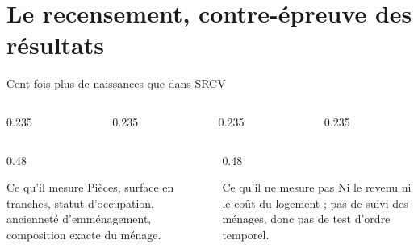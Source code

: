 \documentclass[10pt,aspectratio=169]{beamer}
\begin{document}
\section{Le recensement, contre-épreuve des résultats}

\begin{frame}{Cent fois plus de naissances que dans SRCV}
  \begin{columns}[T]
    \begin{column}{0.235\textwidth}\end{column}
    \begin{column}{0.235\textwidth}\end{column}
    \begin{column}{0.235\textwidth}\end{column}
    \begin{column}{0.235\textwidth}\end{column}
  \end{columns}
  \vspace{0.3cm}
  \begin{columns}[T]
    \begin{column}{0.48\textwidth}
      \begin{callout}[tdteok]{Ce qu'il mesure}
        Pièces, surface en tranches, statut d'occupation, ancienneté d'emménagement, composition exacte du ménage.
      \end{callout}
    \end{column}
    \begin{column}{0.48\textwidth}
      \begin{callout}[tdtered]{Ce qu'il ne mesure pas}
        Ni le revenu ni le coût du logement ; pas de suivi des ménages, donc pas de test d'ordre temporel.
      \end{callout}
    \end{column}
  \end{columns}
\end{frame}
\end{document}
